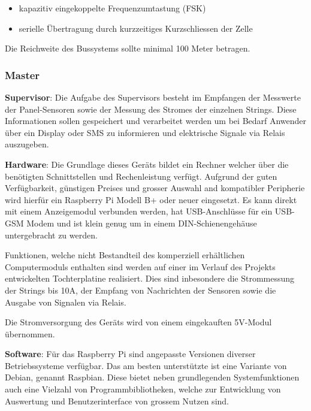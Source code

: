 \begin{itemize}
    \item
        kapazitiv eingekoppelte Frequenzumtastung (FSK)
    \item
        serielle \"Ubertragung durch kurzzeitiges Kurzschliessen der Zelle
\end{itemize}

Die Reichweite des Bussystems sollte minimal 100 Meter betragen.


\subsubsection{Master}

\textbf{Supervisor}:
Die  Aufgabe   des  Supervisors  besteht   im  Empfangen  der   Messwerte  der
Panel-Sensoren  sowie der  Messung  des Stromes  der einzelnen  Strings. Diese
Informationen sollen gespeichert und verarbeitet werden um bei Bedarf Anwender
\"uber ein Display oder SMS zu  informieren und elektrische Signale via Relais
auszugeben.

\textbf{Hardware}:
Die  Grundlage  dieses   Ger\"ats  bildet  ein  Rechner   welcher  \"uber  die
ben\"otigten Schnittstellen  und Rechenleistung verf\"ugt. Aufgrund  der guten
Verf\"ugbarkeit,  g\"unstigen  Preises  und grosser  Auswahl  and  kompatibler
Peripherie wird hierf\"ur ein Raspberry Pi Modell B+ oder neuer eingesetzt. Es
kann  direkt mit  einem  Anzeigemodul verbunden  werden, hat  USB-Anschl\"usse
f\"ur ein USB-GSM Modem und ist  klein genug um in einem DIN-Schienengeh\"ause
untergebracht zu werden.

Funktionen,   welche   nicht   Bestandteil  des   komperziell   erh\"altlichen
Computermoduls  enthalten  sind  werden  auf einer  im  Verlauf  des  Projekts
entwickelten Tochterplatine realisiert. Dies sind inbesondere die Strommessung
der  Strings bis  10A,  der Empfang  von Nachrichten  der  Sensoren sowie  die
Ausgabe von Signalen via Relais.

Die  Stromversorgung  des  Ger\"ats   wird  von  einem  eingekauften  5V-Modul
\"ubernommen.

\textbf{Software}:
F\"ur  das Raspberry  Pi  sind angepasste  Versionen diverser  Betriebssysteme
verf\"ugbar. Das  am  besten  unterst\"utzte  ist eine  Variante  von  Debian,
genannt Raspbian. Diese bietet neben  grundlegenden Systemfunktionen auch eine
Vielzahl von  Programmbibliotheken, welche zur Entwicklung  von Auswertung und
Benutzerinterface von grossem Nutzen sind.
